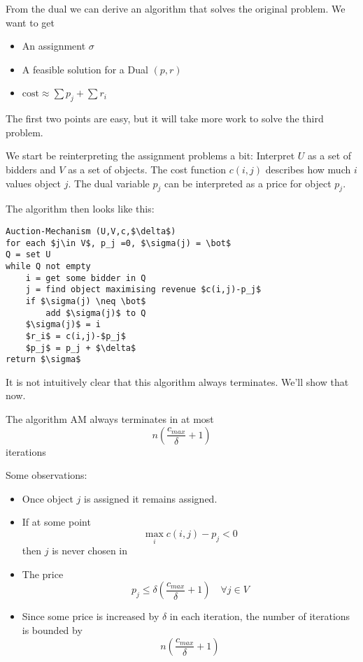 From the dual we can derive an algorithm that solves the original problem. We want to get 

\begin{itemize}
\item An assignment $\sigma$
\item A feasible solution for a Dual $(p,r)$
\item $\text{cost} \approx \sum p_j + \sum r_i$
\end{itemize}

The first two points are easy, but it will take more work to solve the third problem.

We start be reinterpreting the assignment problems a bit: Interpret $U$ as a set of bidders and $V$ as a set of objects. The cost function $c(i,j)$ describes how much $i$ values object $j$. The dual variable $p_j$ can be interpreted as a price for object $p_j$.

The algorithm then looks like this:

\begin{lstlisting}
Auction-Mechanism (U,V,c,$\delta$)
for each $j\in V$, p_j =0, $\sigma(j) = \bot$
Q = set U
while Q not empty
	i = get some bidder in Q
	j = find object maximising revenue $c(i,j)-p_j$
	if $\sigma(j) \neq \bot$
		add $\sigma(j)$ to Q
	$\sigma(j)$ = i
	$r_i$ = c(i,j)-$p_j$
	$p_j$ = p_j + $\delta$
return $\sigma$
\end{lstlisting}



It is not intuitively clear that this algorithm always terminates. We'll show that now.

\begin{lem} The algorithm AM always terminates in at most 
\[n\left(\frac {c_{max}}{\delta} +1\right)\]
iterations
\end{lem}

Some observations:

\begin{itemize}
\item Once object $j$ is assigned it remains assigned. 
\item If at some point 
\[\max_i c(i,j) - p_j <0\]
then $j$ is never chosen in %
\item The price 
\[p_j\leq \delta \left( \frac{c_{max}}{\delta} +1\right) \quad \forall j\in V\] %
\item Since some price is increased by $\delta$ in each iteration, the number of iterations is bounded by
\[n\left(\frac {c_{max}}{\delta} +1\right)\]
\end{itemize}

